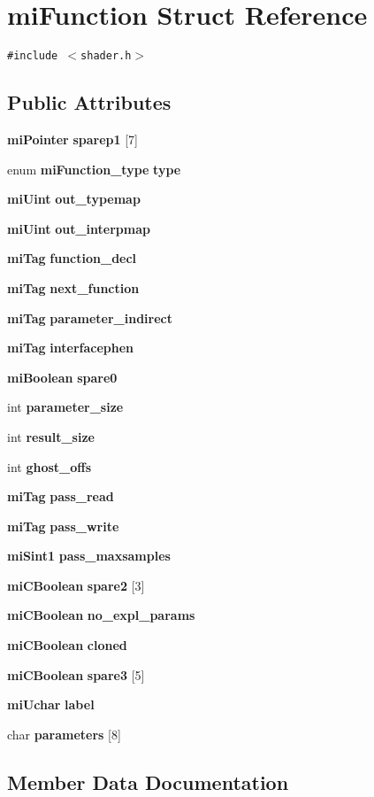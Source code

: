 \section{mi\-Function Struct Reference}
\label{structmiFunction}
{\tt \#include $<$shader.h$>$}

\subsection*{Public Attributes}
\begin{CompactItemize}
\item 
{\bf mi\-Pointer} {\bf sparep1} [7]
\item 
enum {\bf mi\-Function\_\-type} {\bf type}
\item 
{\bf mi\-Uint} {\bf out\_\-typemap}
\item 
{\bf mi\-Uint} {\bf out\_\-interpmap}
\item 
{\bf mi\-Tag} {\bf function\_\-decl}
\item 
{\bf mi\-Tag} {\bf next\_\-function}
\item 
{\bf mi\-Tag} {\bf parameter\_\-indirect}
\item 
{\bf mi\-Tag} {\bf interfacephen}
\item 
{\bf mi\-Boolean} {\bf spare0}
\item 
int {\bf parameter\_\-size}
\item 
int {\bf result\_\-size}
\item 
int {\bf ghost\_\-offs}
\item 
{\bf mi\-Tag} {\bf pass\_\-read}
\item 
{\bf mi\-Tag} {\bf pass\_\-write}
\item 
{\bf mi\-Sint1} {\bf pass\_\-maxsamples}
\item 
{\bf mi\-CBoolean} {\bf spare2} [3]
\item 
{\bf mi\-CBoolean} {\bf no\_\-expl\_\-params}
\item 
{\bf mi\-CBoolean} {\bf cloned}
\item 
{\bf mi\-CBoolean} {\bf spare3} [5]
\item 
{\bf mi\-Uchar} {\bf label}
\item 
char {\bf parameters} [8]
\end{CompactItemize}


\subsection{Member Data Documentation}
